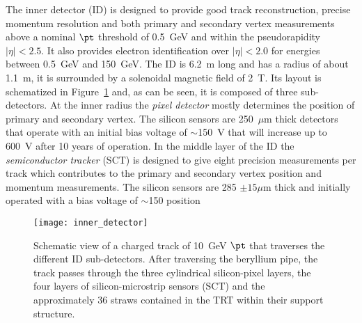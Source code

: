 The inner detector (ID) is designed to provide good track reconstruction,
precise momentum resolution and both primary and secondary vertex measurements
above a nominal $\pt$ threshold of 0.5~GeV and within the pseudorapidity
$|\eta| < 2.5$. It also provides electron identification over $|\eta| < 2.0$ for
energies between 0.5~GeV and 150~GeV\cite{ATLASPaper}. The ID is 6.2~m long and
has a radius of about 1.1~m, it is surrounded by a solenoidal magnetic field of
2~T. Its layout is schematized in Figure~\ref{fig:id} and, as can be seen, it is
composed of three sub-detectors. At the inner radius the \emph{pixel detector}
mostly determines the position of primary and secondary vertex. The silicon
sensors are 250~$\mu$m thick detectors that operate with an initial bias voltage
of $\sim$150~V that will increase up to 600~V after 10 years of operation. In
the middle layer of the ID the \emph{semiconductor tracker} (SCT) is designed to
give eight precision measurements per track which contributes to the primary and
secondary vertex position and momentum measurements. The silicon sensors are 285
$\pm 15 \mu$m thick and initially operated with a bias voltage of $\sim$150
position
\begin{figure}[!h]
  \centering
    \texttt{[image: inner\_detector]}
    \caption{Schematic view of a charged track of 10~GeV $\pt$ that traverses
      the different ID sub-detectors. After traversing the beryllium pipe, the
      track passes through the three cylindrical silicon-pixel layers, the four
      layers of silicon-microstrip sensors (SCT) and the approximately 36 straws
      contained in the TRT within their support structure.}
    \label{fig:id}
\end{figure}
